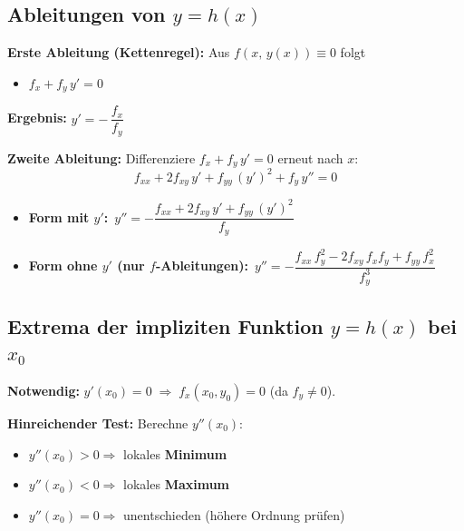\documentclass[a4paper,11pt,oneside,open=any,parskip=half, DIV=15]{scrreprt}
\begin{document}
      \subsection*{Ableitungen von \(y=h(x)\)}

         \textbf{Erste Ableitung (Kettenregel):} Aus \(f(x,\,y(x))\equiv 0\) folgt
            \begin{itemize}
               \item \(f_x + f_y\,y' = 0\)
            \end{itemize}

            \begin{importantbox}
               \textbf{Ergebnis:} \(y' = -\,\dfrac{f_x}{f_y}\)
            \end{importantbox}

         \textbf{Zweite Ableitung:} Differenziere \(f_x + f_y\,y' = 0\) erneut nach \(x\):
            \[
               f_{xx} + 2f_{xy}\,y' + f_{yy}\,(y')^2 + f_y\,y'' = 0
            \]

         \begin{importantbox}
            \begin{itemize}
            \item \textbf{Form mit \(y'\):} \(\displaystyle \,y'' = -\dfrac{f_{xx} + 2f_{xy}\,y' + f_{yy}\,(y')^2}{f_y}\,\)
            \item \textbf{Form ohne \(y'\) (nur \(f\)-Ableitungen):} \(\displaystyle \,y'' = -\dfrac{f_{xx}\,f_y^{2} - 2f_{xy}\,f_x f_y + f_{yy}\,f_x^{2}}{f_y^{3}}\,\)
            \end{itemize}
         \end{importantbox}

      \subsection*{Extrema der impliziten Funktion \(y=h(x)\) bei \(x_0\)}

         \textbf{Notwendig:} \(y'(x_0)=0 \;\Rightarrow\; f_x(x_0,y_0)=0\) (da \(f_y\neq 0\)).

         \textbf{Hinreichender Test:} Berechne \(y''(x_0)\):
         \begin{itemize}
            \item \(y''(x_0) > 0 \Rightarrow\) lokales \textbf{Minimum}
            \item \(y''(x_0) < 0 \Rightarrow\) lokales \textbf{Maximum}  
            \item \(y''(x_0) = 0 \Rightarrow\) unentschieden (höhere Ordnung prüfen)
         \end{itemize}
\end{document}
